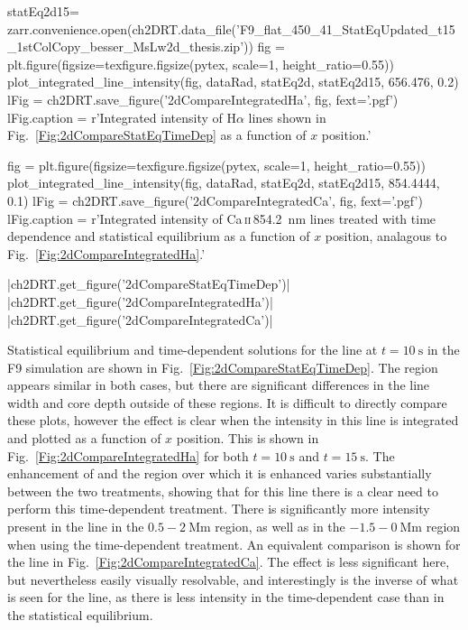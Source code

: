 \begin{pycode}[2DRT]
statEq2d15= zarr.convenience.open(ch2DRT.data_file('F9_flat_450_41_StatEqUpdated_t15_1stColCopy_besser_MsLw2d_thesis.zip'))
fig = plt.figure(figsize=texfigure.figsize(pytex, scale=1, height_ratio=0.55))
plot_integrated_line_intensity(fig, dataRad, statEq2d, statEq2d15, 656.476, 0.2)
lFig = ch2DRT.save_figure('2dCompareIntegratedHa', fig, fext='.pgf')
lFig.caption = r'Integrated intensity of H$\alpha$ lines shown in Fig.~\ref{Fig:2dCompareStatEqTimeDep} as a function of $x$ position.'

fig = plt.figure(figsize=texfigure.figsize(pytex, scale=1, height_ratio=0.55))
plot_integrated_line_intensity(fig, dataRad, statEq2d, statEq2d15, 854.4444, 0.1)
lFig = ch2DRT.save_figure('2dCompareIntegratedCa', fig, fext='.pgf')
lFig.caption = r'Integrated intensity of Ca\,\textsc{ii}\,\SI{854.2}{\nano\metre} lines treated with time dependence and statistical equilibrium as a function of $x$ position, analagous to Fig.~\ref{Fig:2dCompareIntegratedHa}.'

\end{pycode}

\py[2DRT]|ch2DRT.get_figure('2dCompareStatEqTimeDep')|
\py[2DRT]|ch2DRT.get_figure('2dCompareIntegratedHa')|
\py[2DRT]|ch2DRT.get_figure('2dCompareIntegratedCa')|

Statistical equilibrium and time-dependent solutions for the \Ha{} line at $t=\SI{10}{\second}$ in the F9 simulation are shown in Fig.~\ref{Fig:2dCompareStatEqTimeDep}.
The \regiona{} region appears similar in both cases, but there are significant differences in the line width and core depth outside of these regions.
It is difficult to directly compare these plots, however the effect is clear when the intensity in this line is integrated and plotted as a function of $x$ position.
This is shown in Fig.~\ref{Fig:2dCompareIntegratedHa} for both $t=\SI{10}{\second}$ and $t=\SI{15}{\second}$.
The enhancement of \Ha{} and the region over which it is enhanced varies substantially between the two treatments, showing that for this line there is a clear need to perform this time-dependent treatment.
There is significantly more intensity present in the line in the $0.5-\SI{2}{\mega\metre}$ region, as well as in the $-1.5-\SI{0}{\mega\metre}$ region when using the time-dependent treatment.
An equivalent comparison is shown for the \CaLine{} line in Fig.~\ref{Fig:2dCompareIntegratedCa}.
The effect is less significant here, but nevertheless easily visually resolvable, and interestingly is the inverse of what is seen for the \Ha{} line, as there is less intensity in the time-dependent case than in the statistical equilibrium.

